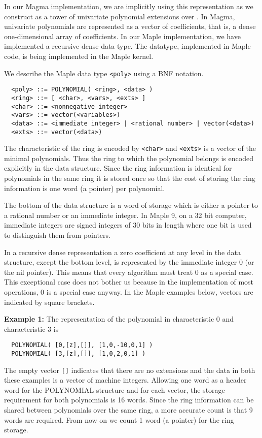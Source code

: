 \documentclass[10pt]{article}
\begin{document}
In our Magma implementation, we are implicitly using this representation
as we construct  as a tower of univariate polynomial extensions over
. In Magma, univariate polynomials are represented as a vector
of coefficients, that is, a dense one-dimensional array of coefficients.
In our Maple implementation, we have implemented a recursive dense data type.
The datatype, implemented in Maple code, is being implemented in the Maple kernel.

We describe the Maple data type {\tt <poly>} using a BNF notation.
\begin{verbatim}
  <poly> ::= POLYNOMIAL( <ring>, <data> )
  <ring> ::= [ <char>, <vars>, <exts> ]
  <char> ::= <nonnegative integer>
  <vars> ::= vector(<variables>)
  <data> ::= <immediate integer> | <rational number> | vector(<data>)
  <exts> ::= vector(<data>)
\end{verbatim}

\noindent
The characteristic of the ring is encoded by \verb+<char>+
and \verb+<exts>+ is a vector of the minimal polynomials.
Thus the ring to which the polynomial belongs is encoded
explicitly in the data structure.  Since the ring information
is identical for polynomials in the same ring it is stored
once so that the cost of storing the ring information
is one word (a pointer) per polynomial.

The bottom of the data structure is a word of storage which is
either a pointer to a rational number or an immediate integer.
In Maple 9, on a 32 bit computer, immediate integers are signed
integers of 30 bits in length where one bit is used to distinguish
them from pointers.



In a recursive dense representation a zero coefficient at any level
in the data structure, except the bottom level, is represented by
the immediate integer 0 (or the nil pointer). This means that every
algorithm must treat 0 as a special case. This exceptional case does
not bother us because in the implementation of most operations, 0 is
a special case anyway. In the Maple examples below, vectors are
indicated by square brackets.

\medskip
\noindent
{\bf Example 1:} The representation of the polynomial
 in characteristic 0 and characteristic 3 is
\begin{verbatim}
  POLYNOMIAL( [0,[z],[]], [1,0,-10,0,1] )
  POLYNOMIAL( [3,[z],[]], [1,0,2,0,1] )
\end{verbatim}
The empty vector \verb+[]+ indicates that there are no extensions and the
data in both these examples is a vector of machine integers.
Allowing one word as a header word for the POLYNOMIAL structure and for
each vector, the storage requirement for both polynomials is 16 words.
Since the ring information can be shared between polynomials over the same
ring, a more accurate count is that 9 words are required. From
now on we count 1 word (a pointer) for the ring storage.
\end{document}
